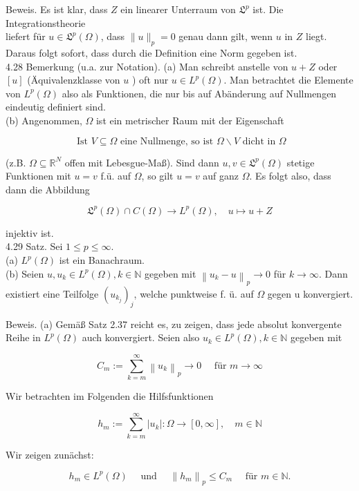 \documentclass[10pt, letterpaper]{article}
\begin{document}
Beweis. Es ist klar, dass $Z$ ein linearer Unterraum von $\mathfrak{L}^{p}$ ist. Die Integrationstheorie\\
liefert für $u \in \mathfrak{L}^{p}(\Omega)$, dass $\|u\|_{p}=0$ genau dann gilt, wenn $u$ in $Z$ liegt. Daraus folgt sofort, dass durch die Definition eine Norm gegeben ist.\\
4.28 Bemerkung (u.a. zur Notation). (a) Man schreibt anstelle von $u+Z$ oder $[u]$ (Äquivalenzklasse von $u$ ) oft nur $u \in L^{p}(\Omega)$. Man betrachtet die Elemente von $L^{p}(\Omega)$ also als Funktionen, die nur bis auf Abänderung auf Nullmengen eindeutig definiert sind.\\
(b) Angenommen, $\Omega$ ist ein metrischer Raum mit der Eigenschaft

$$
\text { Ist } V \subseteq \Omega \text { eine Nullmenge, so ist } \Omega \backslash V \text { dicht in } \Omega
$$

(z.B. $\Omega \subseteq \mathbb{R}^{N}$ offen mit Lebesgue-Maß). Sind dann $u, v \in \mathfrak{L}^{p}(\Omega)$ stetige Funktionen mit $u=v$ f.ü. auf $\Omega$, so gilt $u=v$ auf ganz $\Omega$. Es folgt also, dass dann die Abbildung

$$
\mathfrak{L}^{p}(\Omega) \cap C(\Omega) \rightarrow L^{p}(\Omega), \quad u \mapsto u+Z
$$

injektiv ist.\\
4.29 Satz. Sei $1 \leq p \leq \infty$.\\
(a) $L^{p}(\Omega)$ ist ein Banachraum.\\
(b) Seien $u, u_{k} \in L^{p}(\Omega), k \in \mathbb{N}$ gegeben mit $\left\|u_{k}-u\right\|_{p} \rightarrow 0$ für $k \rightarrow \infty$. Dann existiert eine Teilfolge $\left(u_{k_{j}}\right)_{j}$, welche punktweise f. ü. auf $\Omega$ gegen u konvergiert.

Beweis. (a) Gemäß Satz 2.37 reicht es, zu zeigen, dass jede absolut konvergente Reihe in $L^{p}(\Omega)$ auch konvergiert. Seien also $u_{k} \in L^{p}(\Omega), k \in \mathbb{N}$ gegeben mit

$$
C_{m}:=\sum_{k=m}^{\infty}\left\|u_{k}\right\|_{p} \rightarrow 0 \quad \text { für } m \rightarrow \infty
$$

Wir betrachten im Folgenden die Hilfsfunktionen

$$
h_{m}:=\sum_{k=m}^{\infty}\left|u_{k}\right|: \Omega \rightarrow[0, \infty], \quad m \in \mathbb{N}
$$

Wir zeigen zunächst:

$$
h_{m} \in L^{p}(\Omega) \quad \text { und } \quad\left\|h_{m}\right\|_{p} \leq C_{m} \quad \text { für } m \in \mathbb{N} .
$$
\end{document}
